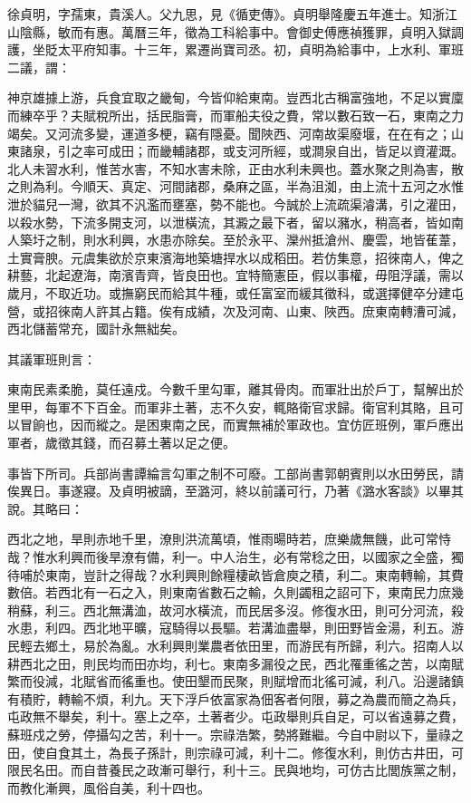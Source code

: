 \begin{pinyinscope}
{{徐貞明，字孺東，貴溪人。父九思，見《循吏傳》。貞明舉隆慶五年進士。知浙江山陰縣，敏而有惠。萬曆三年，徵為工科給事中。會御史傅應禎獲罪，貞明入獄調護，坐貶太平府知事。十三年，累遷尚寶司丞。初，貞明為給事中，上水利、軍班二議，謂：

神京雄據上游，兵食宜取之畿甸，今皆仰給東南。豈西北古稱富強地，不足以實廩而練卒乎？夫賦稅所出，括民脂膏，而軍船夫役之費，常以數石致一石，東南之力竭矣。又河流多變，運道多梗，竊有隱憂。聞陜西、河南故渠廢堰，在在有之；山東諸泉，引之率可成田；而畿輔諸郡，或支河所經，或澗泉自出，皆足以資灌溉。北人未習水利，惟苦水害，不知水害未除，正由水利未興也。蓋水聚之則為害，散之則為利。今順天、真定、河間諸郡，桑麻之區，半為沮洳，由上流十五河之水惟泄於貓兒一灣，欲其不汎濫而壅塞，勢不能也。今誠於上流疏渠濬溝，引之灌田，以殺水勢，下流多開支河，以泄橫流，其澱之最下者，留以瀦水，稍高者，皆如南人築圩之制，則水利興，水患亦除矣。至於永平、灤州抵滄州、慶雲，地皆萑葦，土實膏腴。元虞集欲於京東濱海地築塘捍水以成稻田。若仿集意，招徠南人，俾之耕藝，北起遼海，南濱青齊，皆良田也。宜特簡憲臣，假以事權，毋阻浮議，需以歲月，不取近功。或撫窮民而給其牛種，或任富室而緩其徵科，或選擇健卒分建屯營，或招徠南人許其占籍。俟有成績，次及河南、山東、陜西。庶東南轉漕可減，西北儲蓄常充，國計永無絀矣。

其議軍班則言：

東南民素柔脆，莫任遠戍。今數千里勾軍，離其骨肉。而軍壯出於戶丁，幫解出於里甲，每軍不下百金。而軍非土著，志不久安，輒賂衛官求歸。衛官利其賂，且可以冒餉也，因而縱之。是困東南之民，而實無補於軍政也。宜仿匠班例，軍戶應出軍者，歲徵其錢，而召募土著以足之便。

事皆下所司。兵部尚書譚綸言勾軍之制不可廢。工部尚書郭朝賓則以水田勞民，請俟異日。事遂寢。及貞明被謫，至潞河，終以前議可行，乃著《潞水客談》以畢其說。其略曰：

西北之地，旱則赤地千里，潦則洪流萬頃，惟雨暘時若，庶樂歲無饑，此可常恃哉？惟水利興而後旱潦有備，利一。中人治生，必有常稔之田，以國家之全盛，獨待哺於東南，豈計之得哉？水利興則餘糧棲畝皆倉庾之積，利二。東南轉輸，其費數倍。若西北有一石之入，則東南省數石之輸，久則蠲租之詔可下，東南民力庶幾稍蘇，利三。西北無溝洫，故河水橫流，而民居多沒。修復水田，則可分河流，殺水患，利四。西北地平曠，寇騎得以長驅。若溝洫盡舉，則田野皆金湯，利五。游民輕去鄉土，易於為亂。水利興則業農者依田里，而游民有所歸，利六。招南人以耕西北之田，則民均而田亦均，利七。東南多漏役之民，西北罹重徭之苦，以南賦繁而役減，北賦省而徭重也。使田墾而民聚，則賦增而北徭可減，利八。沿邊諸鎮有積貯，轉輸不煩，利九。天下浮戶依富家為佃客者何限，募之為農而簡之為兵，屯政無不舉矣，利十。塞上之卒，土著者少。屯政舉則兵自足，可以省遠募之費，蘇班戍之勞，停攝勾之苦，利十一。宗祿浩繁，勢將難繼。今自中尉以下，量祿之田，使自食其土，為長子孫計，則宗祿可減，利十二。修復水利，則仿古井田，可限民名田。而自昔養民之政漸可舉行，利十三。民與地均，可仿古比閭族黨之制，而教化漸興，風俗自美，利十四也。

}}
\end{pinyinscope}
